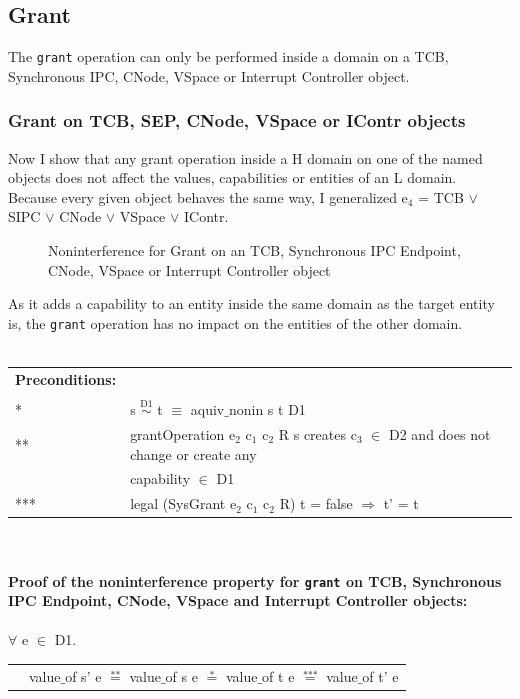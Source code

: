 \documentclass[11pt,a4paper,twoside]{article}
\begin{document}
{\subsection{Grant}\label{sec:Grant}
The \texttt{grant} operation can only be performed inside a domain on a TCB, Synchronous IPC, CNode, VSpace or Interrupt Controller object. 
\subsubsection{Grant on TCB, SEP, CNode, VSpace or IContr objects} 
Now I show that any grant operation inside a H domain on one of the named objects does not affect the values, capabilities or entities of an L domain. \\
Because every given object behaves the same way, I generalized e$_4$ = TCB $\vee$ SIPC $\vee$ CNode $\vee$ VSpace $\vee$ IContr.
\begin{flushleft}
\begin{figure}[H]
\caption{Noninterference for Grant on an TCB, Synchronous IPC Endpoint, CNode, VSpace or Interrupt Controller object}
\end{figure}
\end{flushleft}
As it adds a capability to an entity inside the same domain as the target entity is, the \texttt{grant} operation has no impact on the entities of the other domain. \\ \\
\begin{tabular}{ll}
\textbf{Preconditions:} \\ \\
* & s $\overset{\text{D1}}{\sim}$ t $\equiv$ aquiv$\_$nonin s t D1	\\ 
** & grantOperation e$_2$ c$_1$ c$_2$ R s creates c$_3$ $\in$ D2 and does not change or create any \\
& capability $\in$ D1 \\ 
*** & legal (SysGrant e$_2$ c$_1$ c$_2$ R) t = false $\Rightarrow$ t' = t
\end{tabular}\\ \\ 
\textbf{Proof of the noninterference property for \texttt{grant} on TCB, Synchronous IPC Endpoint, CNode, VSpace and Interrupt Controller objects:}\\ \\
$\forall$ e $\in$ D1. \\ 
\begin{tabular}{ll}
& value$\_$of s' e $\overset{\text{**}}{=}$ value$\_$of s e $\overset{\text{*}}{=}$ value$\_$of t e $\overset{\text{***}}{=}$ value$\_$of t' e \\

\end{tabular}}
\end{document}
